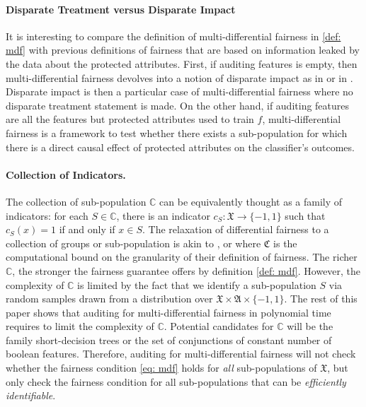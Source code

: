 \documentclass{article}
\begin{document}
\paragraph{Disparate Treatment versus Disparate Impact}
It is interesting to compare the definition of multi-differential fairness in \ref{def: mdf} with previous definitions of fairness that are based on information leaked by the data about the protected attributes.  First, if auditing features is empty, then multi-differential fairness devolves into a notion of disparate impact as in \cite{feldman2015certifying} or in \cite{chouldechova2017fair}. Disparate impact is then a particular case of multi-differential fairness where no disparate treatment  statement is made. On the other hand, if auditing features are all the features but protected attributes used to train $f$, multi-differential fairness is a framework to test whether there exists a sub-population for which there is a direct causal effect of protected attributes on the classifier's outcomes. 


\paragraph{Collection of Indicators.}
The collection of sub-population $\mathbb{C}$ can be equivalently thought as a family of indicators: for each $S\in \mathbb{C}$, there is an indicator $c_{S}: \mathfrak{X}\rightarrow \{-1, 1\}$ such that $c_{S}(x)=1$ if and only if $x\in S$. The relaxation of differential fairness to a collection of groups or sub-population is akin to \cite{kim2018fairness}, \cite{kearns2017preventing} or \cite{hebert2017calibration} where $\mathfrak{C}$ is the computational bound on the granularity of their definition of fairness. The richer $\mathbb{C}$, the stronger the fairness guarantee offers by definition \ref{def: mdf}. However, the complexity of $\mathbb{C}$ is limited by the fact that we identify a sub-population $S$ via random samples drawn from a distribution over $\mathfrak{X} \times \mathfrak{A}\times \{-1, 1\}$. The rest of this paper shows that auditing for multi-differential fairness in polynomial time requires to limit the complexity of $\mathbb{C}$. Potential candidates for $\mathbb{C}$ will be the family short-decision trees or the set of conjunctions of constant number of boolean features. Therefore, auditing for multi-differential fairness will not check whether the fairness condition \eqref{eq: mdf} holds for \textit{all} sub-populations of $\mathfrak{X}$, but only check  the fairness condition for all sub-populations that can be \textit{efficiently identifiable}. 
\end{document}
